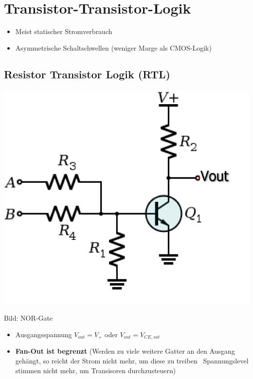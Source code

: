 \section{Transistor-Transistor-Logik}

\begin{itemize}
    \item Meist statischer Stromverbrauch
    \item Asymmetrische Schaltschwellen (weniger Marge als CMOS-Logik)
\end{itemize}


\subsection{Resistor Transistor Logik (RTL)}

\begin{minipage}[c]{0.27\columnwidth}
    \includegraphics[width=\columnwidth]{images/rtl_nor.png}
\end{minipage}
\hfill
\begin{minipage}[c]{0.68\columnwidth}
    Bild: NOR-Gate

    \begin{itemize}
        \item Ausgangsspannung $V_{out} = V_+$ oder $V_{out} = V_{CE,sat}$
        \item \textbf{Fan-Out ist begrenzt} (Werden zu viele weitere Gatter an den Ausgang gehängt, so reicht der Strom nicht mehr,
             um diese zu treiben \textrightarrow\ Spannungslevel stimmen nicht mehr, um Transisoren durchzusteuern)
    \end{itemize}
\end{minipage}



